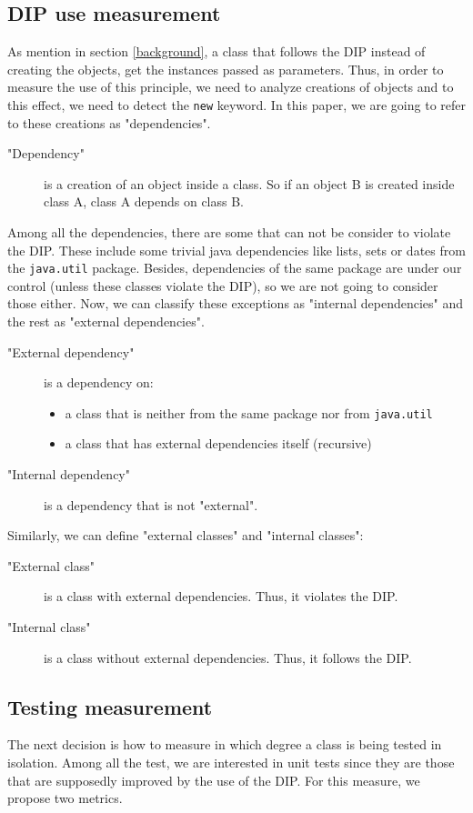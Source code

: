 \documentclass[11pt, a4paper, twocolumn]{article}
\begin{document}
\subsection{DIP use measurement}
As mention in section \ref{background}, a class that follows the DIP instead of creating the objects, get the instances passed as parameters. Thus, in order to measure the use of this principle, we need to analyze creations of objects and to this effect, we need to detect the \texttt{new} keyword.  In this paper, we are going to refer to these creations as "dependencies".
\begin{description}
\item ["Dependency"] is a creation of an object inside a class. So if an object B is created inside class A, class A depends on class B.
\end{description}
Among all the dependencies, there are some that can not be consider to violate the DIP. These include some trivial java dependencies like lists, sets or dates from the \texttt{java.util} package. Besides, dependencies of the same package are under our control (unless these classes violate the DIP), so we are not going to consider those either. Now, we can classify these exceptions as "internal dependencies" and the rest as "external dependencies".
\begin{description}
\item ["External dependency"] is a dependency on:
\begin{itemize}
\item a class that is neither from the same package nor from \texttt{java.util}
\item a class that has external dependencies itself (recursive)
\end{itemize}
\item["Internal dependency"] is a dependency that is not "external".
\end{description}
Similarly, we can define "external classes" and "internal classes":
\begin{description}
\item ["External class"] is a class with external dependencies. Thus, it violates the DIP.
\item["Internal class"] is a class without external dependencies. Thus, it follows the DIP.
\end{description}

\subsection{Testing measurement}
The next decision is how to measure in which degree a class is being tested in isolation. Among all the test, we are interested in unit tests since they are those that are supposedly improved by the use of the DIP. For this measure, we propose two metrics.
\end{document}
